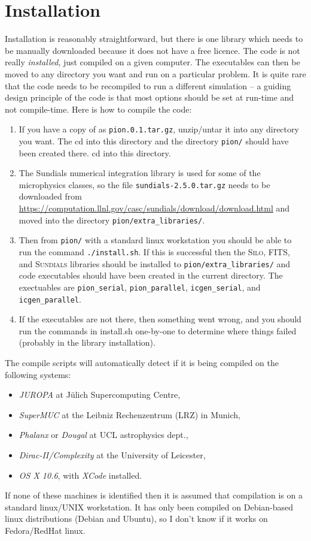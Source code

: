 \documentclass[a4paper,11pt]{report}
\begin{document}
\section{Installation}
Installation is reasonably straightforward, but there is one library which needs to be manually downloaded because it does not have a free licence.
The code is not really \emph{installed}, just compiled on a given computer.
The executables can then be moved to any directory you want and run on a particular problem.
It is quite rare that the code needs to be recompiled to run a different simulation -- a guiding design principle of the code is that most options should be set at run-time and not compile-time.
Here is how to compile the code:
\begin{enumerate}
\item
  If you have a copy of \pion{} as \texttt{pion.0.1.tar.gz}, unzip/untar it into any directory you want.  The cd into this directory and the directory \verb|pion/| should have been created there.  cd into this directory.
\item
  The Sundials numerical integration library is used for some of the microphysics classes, so the file \verb|sundials-2.5.0.tar.gz| needs to be downloaded from \url{https://computation.llnl.gov/casc/sundials/download/download.html} and moved into the directory \verb|pion/extra_libraries/|.
\item
  Then from \verb|pion/| with a standard linux workstation you should be able to run the command \verb|./install.sh|.
  If this is successful then the \textsc{Silo}, \textsc{FITS}, and \textsc{Sundials} libraries should be installed to \verb|pion/extra_libraries/| and code executables should have been created in the current directory.
  The exectuables are \verb|pion_serial|, \verb|pion_parallel|, \verb|icgen_serial|, and \verb|icgen_parallel|.
\item
  If the executables are not there, then something went wrong, and you should run the commands in install.sh one-by-one to determine where things failed (probably in the library installation).
\end{enumerate}

The compile scripts will automatically detect if it is being compiled on the following systems:
\begin{itemize}
\item \emph{JUROPA} at J\"ulich Supercomputing Centre,
\item \emph{SuperMUC} at the Leibniz Rechenzentrum (LRZ) in Munich,
\item \emph{Phalanx} or \emph{Dougal} at UCL astrophysics dept.,
\item \emph{Dirac-II/Complexity} at the University of Leicester,
\item \emph{OS X 10.6}, with \emph{XCode} installed.
\end{itemize}
If none of these machines is identified then it is assumed that compilation is on a standard linux/UNIX workstation.
It has only been compiled on Debian-based linux distributions (Debian and Ubuntu), so I don't know if it works on Fedora/RedHat linux.
\end{document}
